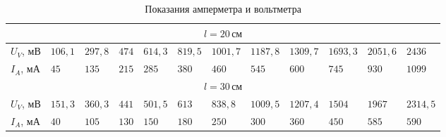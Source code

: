\begin{table}[t!]
    \caption{Показания амперметра и вольтметра}
    \begin{tabular}{|llllllllllll|}
    \hline
    \multicolumn{12}{|c|}{$l=20\,\text{см}$}                                                                                                                                                                                                                                                                                                                                                         \\ \hline
    \multicolumn{1}{|l|}{$U_V$, мВ}   & \multicolumn{1}{l|}{$106{,}1$} & \multicolumn{1}{l|}{$297{,}8$} & \multicolumn{1}{l|}{$474$}      & \multicolumn{1}{l|}{$614{,}3$}  & \multicolumn{1}{l|}{$819{,}5$}  & \multicolumn{1}{l|}{$1001{,}7$} & \multicolumn{1}{l|}{$1187{,}8$} & \multicolumn{1}{l|}{$1309{,}7$} & \multicolumn{1}{l|}{$1693{,}3$} & \multicolumn{1}{l|}{$2051{,}6$} & $2436$     \\ \hline
    \multicolumn{1}{|l|}{$I_A$, мА} & \multicolumn{1}{l|}{$45$}      & \multicolumn{1}{l|}{$135$}     & \multicolumn{1}{l|}{$215$}      & \multicolumn{1}{l|}{$285$}      & \multicolumn{1}{l|}{$380$}      & \multicolumn{1}{l|}{$460$}      & \multicolumn{1}{l|}{$545$}      & \multicolumn{1}{l|}{$600$}      & \multicolumn{1}{l|}{$745$}      & \multicolumn{1}{l|}{$930$}      & $1099$     \\ \hline
    \multicolumn{12}{|c|}{$l=30\,\text{см}$}                                                                                                                                                                                                                                                                                                                                                         \\ \hline
    \multicolumn{1}{|l|}{$U_V$, мВ}   & \multicolumn{1}{l|}{$151{,}3$} & \multicolumn{1}{l|}{$360{,}3$} & \multicolumn{1}{l|}{$441$}      & \multicolumn{1}{l|}{$501{,}5$}  & \multicolumn{1}{l|}{$613$}      & \multicolumn{1}{l|}{$838{,}8$}  & \multicolumn{1}{l|}{$1009{,}5$} & \multicolumn{1}{l|}{$1207{,}4$} & \multicolumn{1}{l|}{$1504$}     & \multicolumn{1}{l|}{$1967$}     & $2314{,}5$ \\ \hline
    \multicolumn{1}{|l|}{$I_A$, мА} & \multicolumn{1}{l|}{$40$}      & \multicolumn{1}{l|}{$105$}     & \multicolumn{1}{l|}{$130$}      & \multicolumn{1}{l|}{$150$}      & \multicolumn{1}{l|}{$180$}      & \multicolumn{1}{l|}{$250$}      & \multicolumn{1}{l|}{$300$}      & \multicolumn{1}{l|}{$360$}      & \multicolumn{1}{l|}{$450$}      & \multicolumn{1}{l|}{$585$}      & $590$      \\ \hline

\end{tabular}
\end{table}
